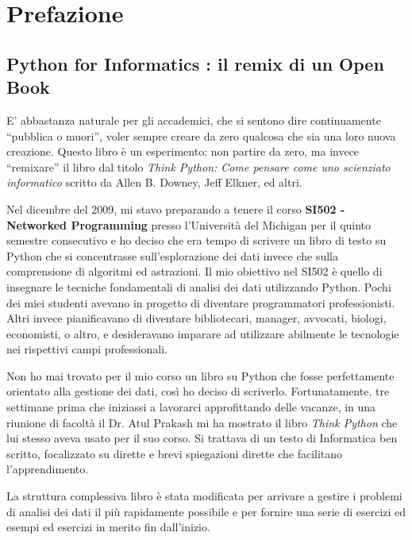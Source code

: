 
\chapter{Prefazione}

\section*{Python for Informatics : il remix di un Open Book}

E' abbastanza naturale per gli accademici, che si sentono dire continuamente {``}pubblica o muori'', voler sempre creare da zero qualcosa che sia una loro nuova creazione. Questo libro \`{e} un esperimento: non partire da zero, ma invece {``}remixare'' il libro dal titolo
\emph{Think Python: Come pensare come uno scienziato informatico}
scritto da Allen B. Downey, Jeff Elkner, ed altri.

Nel dicembre del 2009, mi stavo preparando a tenere il corso
{\bf SI502 - Networked Programming} presso l'Universit\`{a} del Michigan per il quinto semestre consecutivo e ho deciso che era tempo di scrivere un libro di testo su Python che si concentrasse sull'esplorazione dei dati invece che sulla comprensione di algoritmi ed astrazioni. Il mio obiettivo nel SI502 \`{e} quello di insegnare le tecniche fondamentali di analisi dei dati utilizzando Python. Pochi dei miei studenti avevano in progetto di diventare programmatori professionisti. Altri invece pianificavano di diventare bibliotecari, manager, avvocati, biologi, economisti, o altro, e desideravano imparare ad utilizzare abilmente le tecnologie nei rispettivi campi professionali.

Non ho mai trovato per il mio corso un libro su Python che fosse perfettamente orientato alla gestione dei dati, cos\`{i} ho deciso di scriverlo. Fortunatamente, tre settimane prima che iniziassi a lavorarci approfittando delle vacanze, in una riunione di facolt\`{a} il Dr. Atul Prakash mi ha mostrato il libro  \emph{Think Python} che lui stesso aveva usato per il suo corso. Si trattava di un testo di Informatica ben scritto, focalizzato su dirette e brevi spiegazioni dirette che facilitano l'apprendimento.

La struttura complessiva libro \`{e} stata modificata per arrivare a gestire i problemi di analisi dei dati il pi\`{u} rapidamente possibile e per fornire una serie di esercizi ed esempi ed esercizi in merito fin dall'inizio.

